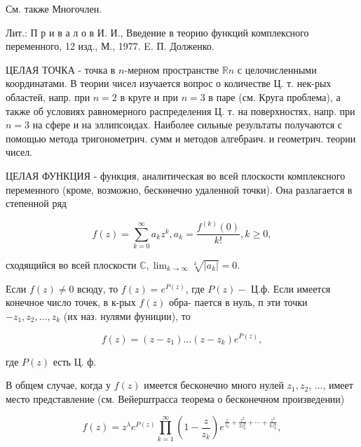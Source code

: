 \documentclass[10pt]{article}
\begin{document}
См. также Многочлен.



Лит.: П р и в а л о в И. И., Введение в теорию функций комплексного переменного, 12 изд., М., 1977. E. П. Долженко.



ЦЕЛАЯ ТОЧКА - точка в $n$-мерном пространстве $\mathbb{R} n$ с целочисленными координатами. В теории чисел изучается вопрос о количестве Ц. т. нек-рых областей, напр. при $n=2$ в круге и при $n=3$ в паре (см. Круга проблема), а также об условиях равномерного распределения Ц. т. на поверхностях, напр. при $n=3$ на сфере и на эллипсоидах. Наиболее сильные результаты получаются с помощью метода тригонометрич. сумм и методов алгебраич. и геометрич. теории чисел.



ЦЕЛАЯ ФУНКЦИЯ - функция, аналитическая во всей плоскости комплексного переменного (кроме, возможно, бескөнечно удаленной точки). Она разлагается в степенной ряд



\[

f(z)=\sum_{k=0}^{\infty} a_{k} z^{k}, a_{k}=\frac{f^{(k)}(0)}{k !}, k \geqslant 0,

\]



сходящийся во всей плоскости $\mathbb{C}, \lim _{k \rightarrow \infty} \sqrt[k]{\left|a_{k}\right|}=0$.



Если $f(z) \neq 0$ всюду, то $f(z)=e^{P(z)}$, где $P(z)-$ Ц.ф. Если имеется конечное число точек, в к-рых $f(z)$ обра- пается в нуль, п эти точки $-z_{1}, z_{2}, \ldots, z_{k}$ (их наз. нулями фуниции), то



\[

f(z)=\left(z-z_{1}\right) \ldots\left(z-z_{k}\right) e^{P(z)},

\]



где $P(z)$ есть Ц. ф.



В общем случае, когда у $f(z)$ имеется бесконечно много нулей $z_{1}, z_{2}$, ..., имеет место представление (см. Вейерштрасса теорема о бесконечном произведении)



\[

f(z)=z^{\lambda} e^{P(z)} \prod_{k=1}^{\infty}\left(1-\frac{z}{z_{k}}\right) e^{\frac{z}{z_{k}}+\frac{z^{2}}{2 z_{k}^{2}}+\cdots+\frac{z^{k}}{k z_{k}^{k}}},

\]
\end{document}
